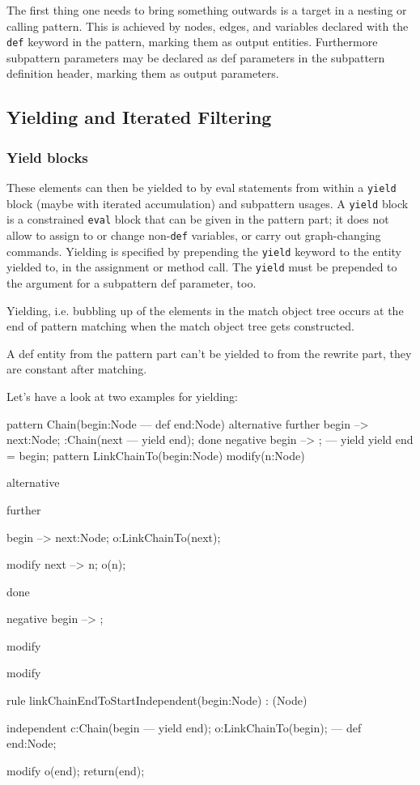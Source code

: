 The first thing one needs to bring something outwards is a target in a nesting or calling pattern. 
This is achieved by nodes, edges, and variables declared with the \texttt{def} keyword in the pattern, marking them as output entities.
Furthermore subpattern parameters may be declared as def parameters in the subpattern definition header,
marking them as output parameters.

\subsection{Yielding and Iterated Filtering} 

\subsubsection*{Yield blocks} 

These elements can then be yielded to by eval statements from within a \texttt{yield} block
(maybe with iterated accumulation) and subpattern usages.
A \texttt{yield} block is a constrained \texttt{eval} block that can be given in the pattern part;
it does not allow to assign to or change non-\texttt{def} variables, or carry out graph-changing commands.
Yielding is specified by prepending the \texttt{yield} keyword to the entity yielded to,
in the assignment or method call.
The \texttt{yield} must be prepended to the argument for a subpattern def parameter, too.

Yielding, i.e. bubbling up of the elements in the match object tree occurs at the end of pattern matching when the match object tree gets constructed.

\begin{warning}
A def entity from the pattern part can't be yielded to from the rewrite part, they are constant after matching.
\end{warning}

Let's have a look at two examples for yielding:

\begin{example}
  \begin{grgen}
pattern Chain(begin:Node --- def end:Node)
{
  alternative {
    further {
      begin --> next:Node;
      :Chain(next --- yield end);
    }
    done {
      negative {
        begin --> ;
      }
      ---
      yield {
        yield end = begin;
      }
    }
  }
}
pattern LinkChainTo(begin:Node) modify(n:Node)
{
  alternative {
    further {
      begin --> next:Node;
      o:LinkChainTo(next);

      modify {
        next --> n;
        o(n);
      }
    }
    done {
      negative {
        begin --> ;
      }

      modify {
      }
    }
  }

  modify { }
}
rule linkChainEndToStartIndependent(begin:Node) : (Node)
{	
  independent {
    c:Chain(begin --- yield end);
  }
  o:LinkChainTo(begin);
--- 
  def end:Node;

  modify {
    o(end);
    return(end);
  }
}
  \end{grgen}
\end{example}

